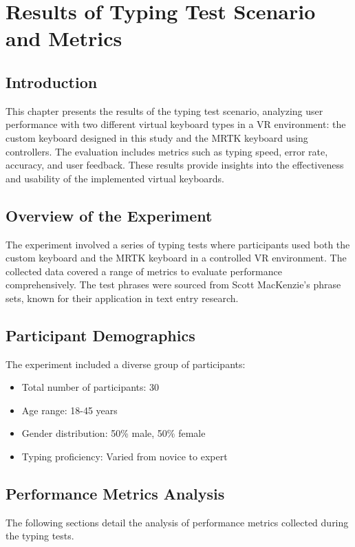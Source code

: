 \chapter{Results of Typing Test Scenario and Metrics}

\section{Introduction}
This chapter presents the results of the typing test scenario, analyzing user performance with two different virtual keyboard types in a VR environment: the custom keyboard designed in this study and the MRTK keyboard using controllers. The evaluation includes metrics such as typing speed, error rate, accuracy, and user feedback. These results provide insights into the effectiveness and usability of the implemented virtual keyboards.

\section{Overview of the Experiment}
The experiment involved a series of typing tests where participants used both the custom keyboard and the MRTK keyboard in a controlled VR environment. The collected data covered a range of metrics to evaluate performance comprehensively. The test phrases were sourced from Scott MacKenzie's phrase sets, known for their application in text entry research.

\section{Participant Demographics}
The experiment included a diverse group of participants:
\begin{itemize}
    \item Total number of participants: 30
    \item Age range: 18-45 years
    \item Gender distribution: 50\% male, 50\% female
    \item Typing proficiency: Varied from novice to expert
\end{itemize}

\section{Performance Metrics Analysis}
The following sections detail the analysis of performance metrics collected during the typing tests.

